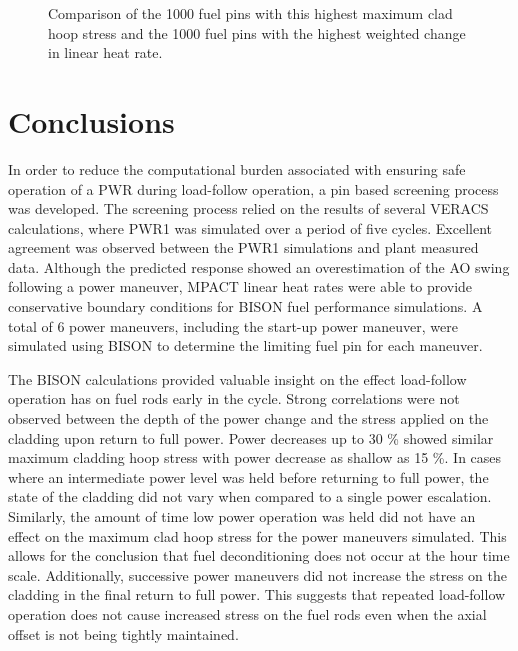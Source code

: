 \documentclass[edeposit,fullpage,11pt]{uiucthesis2009}
\begin{document}
\begin{center}
\begin{figure}[h]
\begin{tabular}{lr}
\end{tabular}
\caption{Comparison of the 1000 fuel pins with this highest maximum clad hoop stress and the 1000 fuel pins with the highest weighted change in linear heat rate.}
\label{fig:comp}
\end{figure}
\end{center}
\chapter{Conclusions}

In order to reduce the computational burden associated with ensuring safe operation of a \gls{PWR} during load-follow operation, a pin based screening process was developed.
The screening process relied on the results of several \gls{VERACS} calculations, where PWR1 was simulated over a period of five cycles.
Excellent agreement was observed between the PWR1 simulations and plant measured data.
Although the predicted response showed an overestimation of the \gls{AO} swing following a power maneuver, MPACT linear heat rates were able to provide conservative boundary conditions for BISON fuel performance simulations.
A total of 6 power maneuvers, including the start-up power maneuver, were simulated using BISON to determine the limiting fuel pin for each maneuver.

The BISON calculations provided valuable insight on the effect load-follow operation has on fuel rods early in the cycle.
Strong correlations were not observed between the depth of the power change and the stress applied on the cladding upon return to full power.
Power decreases up to 30 \% showed similar maximum cladding hoop stress with power decrease as shallow as 15 \%.
In cases where an intermediate power level was held before returning to full power, the state of the cladding did not vary when compared to a single power escalation.
Similarly, the amount of time low power operation was held did not have an effect on the maximum clad hoop stress for the power maneuvers simulated.
This allows for the conclusion that fuel deconditioning does not occur at the hour time scale.
Additionally, successive power maneuvers did not increase the stress on the cladding in the final return to full power.
This suggests that repeated load-follow operation does not cause increased stress on the fuel rods even when the axial offset is not being tightly maintained.
\end{document}
